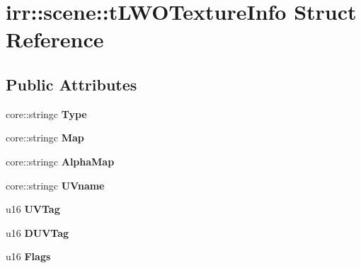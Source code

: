 \hypertarget{structirr_1_1scene_1_1t_l_w_o_texture_info}{\section{irr\-:\-:scene\-:\-:t\-L\-W\-O\-Texture\-Info Struct Reference}
\label{structirr_1_1scene_1_1t_l_w_o_texture_info}
}
\subsection*{Public Attributes}
\begin{DoxyCompactItemize}
\item 
\hypertarget{structirr_1_1scene_1_1t_l_w_o_texture_info_ad5e2d6da70ab1fb9bb1ae1d589af2432}{core\-::stringc {\bfseries Type}}\label{structirr_1_1scene_1_1t_l_w_o_texture_info_ad5e2d6da70ab1fb9bb1ae1d589af2432}

\item 
\hypertarget{structirr_1_1scene_1_1t_l_w_o_texture_info_afc525f8a2b5b6d4df43e9c0f8de9008c}{core\-::stringc {\bfseries Map}}\label{structirr_1_1scene_1_1t_l_w_o_texture_info_afc525f8a2b5b6d4df43e9c0f8de9008c}

\item 
\hypertarget{structirr_1_1scene_1_1t_l_w_o_texture_info_a722da858ddbf0f2fff28577ce1589fd5}{core\-::stringc {\bfseries Alpha\-Map}}\label{structirr_1_1scene_1_1t_l_w_o_texture_info_a722da858ddbf0f2fff28577ce1589fd5}

\item 
\hypertarget{structirr_1_1scene_1_1t_l_w_o_texture_info_ab3f606992b1a48ccc66484d0b95f508c}{core\-::stringc {\bfseries U\-Vname}}\label{structirr_1_1scene_1_1t_l_w_o_texture_info_ab3f606992b1a48ccc66484d0b95f508c}

\item 
\hypertarget{structirr_1_1scene_1_1t_l_w_o_texture_info_a7876acb4738175d973d2290982e43953}{u16 {\bfseries U\-V\-Tag}}\label{structirr_1_1scene_1_1t_l_w_o_texture_info_a7876acb4738175d973d2290982e43953}

\item 
\hypertarget{structirr_1_1scene_1_1t_l_w_o_texture_info_aa12ce72f06b176b85b885b3b42fdbfe2}{u16 {\bfseries D\-U\-V\-Tag}}\label{structirr_1_1scene_1_1t_l_w_o_texture_info_aa12ce72f06b176b85b885b3b42fdbfe2}

\item 
\hypertarget{structirr_1_1scene_1_1t_l_w_o_texture_info_a00e6f8e9cc4cf2d1c62ff32dbff88678}{u16 {\bfseries Flags}}\label{structirr_1_1scene_1_1t_l_w_o_texture_info_a00e6f8e9cc4cf2d1c62ff32dbff88678}


\end{DoxyCompactItemize}
